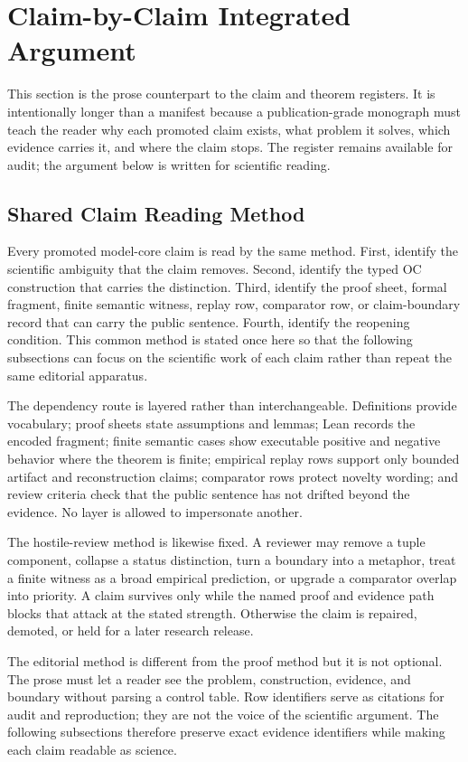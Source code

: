 \section{Claim-by-Claim Integrated Argument}
\label{sec:oc133-claim-by-claim-integrated-argument}
This section is the prose counterpart to the claim and theorem registers. It is intentionally longer than a manifest because a publication-grade monograph must teach the reader why each promoted claim exists, what problem it solves, which evidence carries it, and where the claim stops. The register remains available for audit; the argument below is written for scientific reading.

\subsection{Shared Claim Reading Method}
Every promoted model-core claim is read by the same method. First, identify the scientific ambiguity that the claim removes. Second, identify the typed OC construction that carries the distinction. Third, identify the proof sheet, formal fragment, finite semantic witness, replay row, comparator row, or claim-boundary record that can carry the public sentence. Fourth, identify the reopening condition. This common method is stated once here so that the following subsections can focus on the scientific work of each claim rather than repeat the same editorial apparatus.

The dependency route is layered rather than interchangeable. Definitions provide vocabulary; proof sheets state assumptions and lemmas; Lean records the encoded fragment; finite semantic cases show executable positive and negative behavior where the theorem is finite; empirical replay rows support only bounded artifact and reconstruction claims; comparator rows protect novelty wording; and review criteria check that the public sentence has not drifted beyond the evidence. No layer is allowed to impersonate another.

The hostile-review method is likewise fixed. A reviewer may remove a tuple component, collapse a status distinction, turn a boundary into a metaphor, treat a finite witness as a broad empirical prediction, or upgrade a comparator overlap into priority. A claim survives only while the named proof and evidence path blocks that attack at the stated strength. Otherwise the claim is repaired, demoted, or held for a later research release.

The editorial method is different from the proof method but it is not optional. The prose must let a reader see the problem, construction, evidence, and boundary without parsing a control table. Row identifiers serve as citations for audit and reproduction; they are not the voice of the scientific argument. The following subsections therefore preserve exact evidence identifiers while making each claim readable as science.

